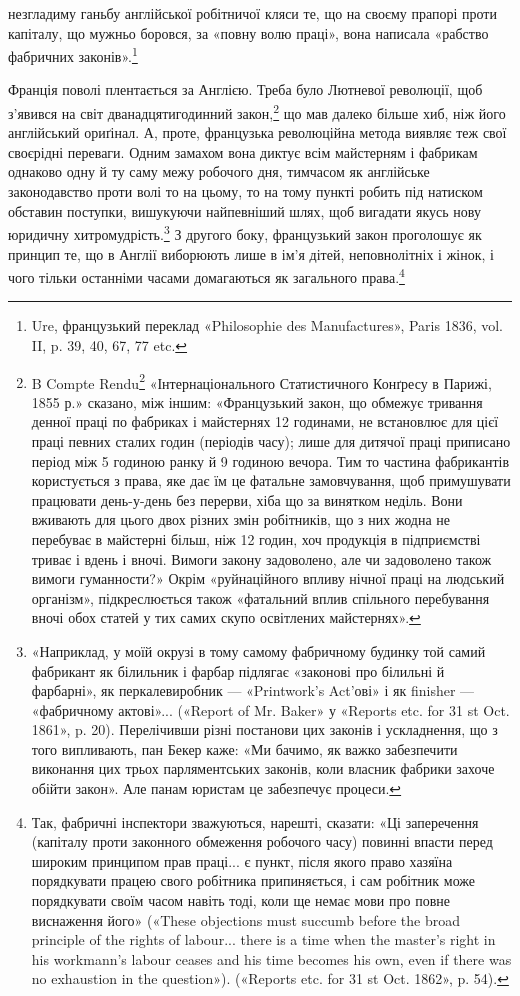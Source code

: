 \parcont{}  %
незгладиму ганьбу англійської робітничої кляси те, що на своєму
прапорі проти капіталу, що мужньо боровся, за «повну волю
праці», вона написала «рабство фабричних законів».\footnote{
Ure, французький переклад «Philosophie des Manufactures», Paris
1836, vol. II, p. 39, 40, 67, 77 etc.
}

Франція поволі плентається за Англією. Треба було Лютневої
революції, щоб з’явився на світ дванадцятигодинний закон,\footnote{
B Compte Rendu\footnote*{
— звіті. Ред.
} «Інтернаціонального Статистичного Конґресу
в Парижі, 1855 р.» сказано, між іншим: «Французький закон,
що обмежує тривання денної праці по фабриках і майстернях 12 годинами,
не встановлює для цієї праці певних сталих годин (періодів часу); лише
для дитячої праці приписано період між 5 годиною ранку й 9 годиною вечора.
Тим то частина фабрикантів користується з права, яке дає їм
це фатальне замовчування, щоб примушувати працювати день-у-день
без перерви, хіба що за винятком неділь. Вони вживають для цього двох
різних змін робітників, що з них жодна не перебуває в майстерні більш,
ніж 12 годин, хоч продукція в підприємстві триває і вдень і вночі. Вимоги
закону задоволено, але чи задоволено також вимоги гуманности?» Окрім
«руйнаційного впливу нічної праці на людський організм», підкреслюється
також «фатальний вплив спільного перебування вночі обох статей
у тих самих скупо освітлених майстернях».
}
що мав далеко більше хиб, ніж його англійський ориґінал. А, проте,
французька революційна метода виявляє теж свої своєрідні
переваги. Одним замахом вона диктує всім майстерням і фабрикам
однаково одну й ту саму межу робочого дня, тимчасом як
англійське законодавство проти волі то на цьому, то на тому
пункті робить під натиском обставин поступки, вишукуючи найпевніший
шлях, щоб вигадати якусь нову юридичну хитромудрість.\footnote{
«Наприклад, у моїй окрузі в тому самому фабричному будинку
той самий фабрикант як білильник і фарбар підлягає «законові про білильні
й фарбарні», як перкалевиробник — «Printwork’s Act’ові» і як finisher —
«фабричному актові»... («Report of Mr. Baker» у «Reports etc. for 31 st
Oct. 1861», p. 20). Перелічивши різні постанови цих законів і ускладнення,
що з того випливають, пан Бекер каже: «Ми бачимо, як важко забезпечити
виконання цих трьох парляментських законів, коли власник фабрики
захоче обійти закон». Але панам юристам це забезпечує процеси.
}
З другого боку, французький закон проголошує як
принцип те, що в Англії виборюють лише в ім’я дітей, неповнолітніх
і жінок, і чого тільки останніми часами домагаються як
загального права.\footnote{
Так, фабричні інспектори зважуються, нарешті, сказати: «Ці
заперечення (капіталу проти законного обмеження робочого часу) повинні
впасти перед широким принципом прав праці... є пункт, після якого право
хазяїна порядкувати працею свого робітника припиняється, і сам робітник
може порядкувати своїм часом навіть тоді, коли ще немає мови про повне
виснаження його» («These objections must succumb before the broad
principle of the rights of labour... there is a time when the master’s right
in his workmann’s labour ceases and his time becomes his own, even if
there was no exhaustion in the question»). («Reports etc. for 31 st Oct.
1862», p. 54).
}

